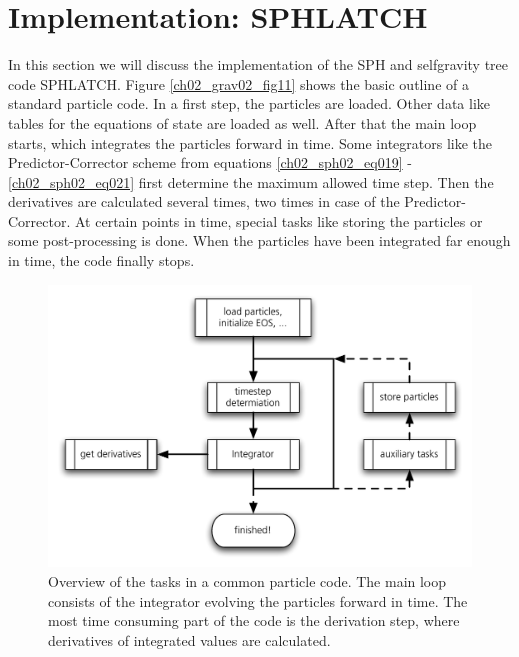 \section{Implementation: SPHLATCH}
In this section we will discuss the implementation of the SPH and selfgravity tree code SPHLATCH. Figure \ref{ch02_grav02_fig11} shows the basic outline of a standard particle code. In a first step, the particles are loaded. Other data like tables for the equations of state are loaded as well. After that the main loop starts, which integrates the particles forward in time. Some integrators like the Predictor-Corrector scheme from equations \ref{ch02_sph02_eq019} - \ref{ch02_sph02_eq021} first determine the maximum allowed time step. Then the derivatives are calculated several times, two times in case of the Predictor-Corrector. At certain points in time, special tasks like storing the particles or some post-processing is done. When the particles have been integrated far enough in time, the code finally stops.

\begin{figure}[htbp]
\begin{center}
\includegraphics[scale=0.6]{20algo_overview.pdf}
\caption{Overview of the tasks in a common particle code. The main loop consists of the integrator evolving the particles forward in time. The most time consuming part of the code is the derivation step, where derivatives of integrated values are calculated.}
\label{ch02_fig20}
\end{center}
\end{figure}

